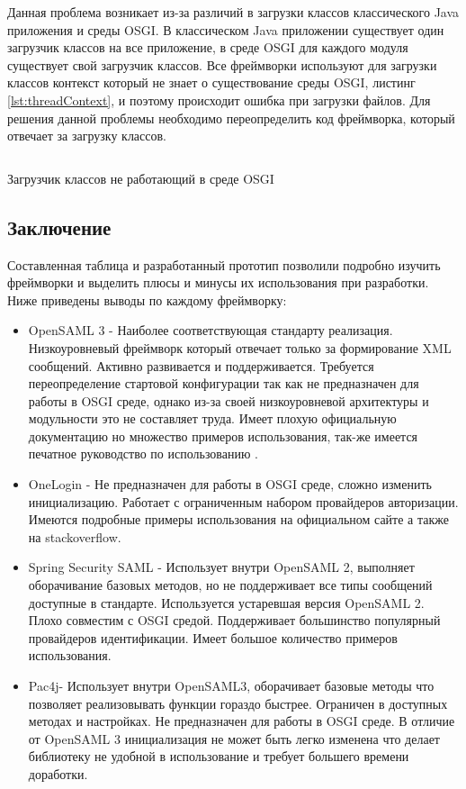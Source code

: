 Данная проблема возникает из-за различий в загрузки классов классического Java приложения и среды OSGI. В классическом Java приложении существует один загрузчик классов на все приложение, в среде OSGI для каждого модуля существует свой загрузчик классов. Все фреймворки используют для загрузки классов контекст который не знает о существование среды OSGI, листинг \ref{lst:threadContext}, и поэтому происходит ошибка при загрузки файлов. Для решения данной проблемы необходимо переопределить код фреймворка, который отвечает за загрузку классов.

\begin{listing}[H]
\inputminted[linenos,frame=single]{java}{inc/src/threadContext}
\caption{Загрузчик классов не работающий в среде OSGI} 
\label{lst:threadContext}
\end{listing}

\subsection{Заключение}
Составленная таблица и разработанный прототип позволили подробно изучить фреймворки и выделить плюсы и минусы их использования при разработки. Ниже приведены выводы по каждому фреймворку:

\begin{itemize}
\item OpenSAML 3 - Наиболее соответствующая стандарту реализация. Низкоуровневый фреймворк который отвечает только за формирование XML сообщений. Активно развивается и поддерживается. Требуется переопределение стартовой конфигурации так как не предназначен для работы в OSGI среде, однако из-за своей низкоуровневой архитектуры и модульности это не составляет труда. Имеет плохую официальную  документацию но множество примеров использования, так-же имеется печатное руководство по использованию \cite{web:openSamlBlog}.
\item OneLogin - Не предназначен для работы в OSGI среде, сложно изменить инициализацию. Работает с ограниченным набором провайдеров авторизации. Имеются подробные примеры использования на официальном сайте а также на stackoverflow.
\item Spring Security SAML - Использует внутри OpenSAML 2, выполняет оборачивание базовых методов, но не поддерживает все типы сообщений доступные в стандарте. Используется устаревшая версия OpenSAML 2. Плохо совместим с OSGI средой. Поддерживает большинство популярный провайдеров идентификации. Имеет большое количество примеров использования.
\item Pac4j- Использует внутри OpenSAML3, оборачивает базовые методы что позволяет реализовывать функции гораздо быстрее. Ограничен в доступных методах и настройках. Не предназначен для работы в OSGI среде. В отличие от OpenSAML 3 инициализация не может быть легко изменена что делает библиотеку не удобной в использование и требует большего времени доработки.
\end{itemize}

